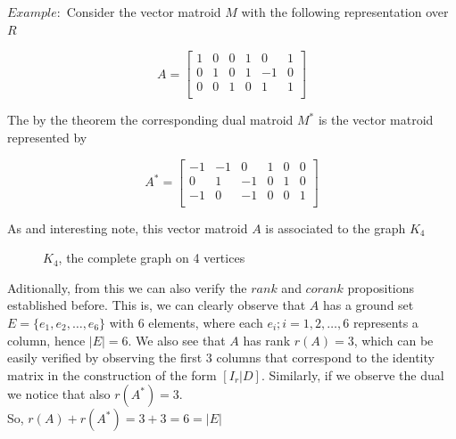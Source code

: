 $Example:$ Consider the vector matroid $M$ with the following representation over $R$
        \begin{figure}[H]
            $$A = \begin{bmatrix}
                1 & 0 & 0 & 1 & 0 & 1 \\
                0 & 1 & 0 & 1 & -1 & 0 \\
                0 & 0 & 1 & 0 & 1 & 1 \\
            \end{bmatrix}$$
        \end{figure}
        
The by the theorem the corresponding dual matroid $M^*$ is the vector matroid represented by 
        \begin{figure}[H]
            $$A^* = \begin{bmatrix}
                -1 & -1 & 0 & 1 & 0 & 0 \\
                0 & 1 & -1 & 0 & 1 & 0 \\
                -1 & 0 & -1 & 0 & 0 & 1 \\
            \end{bmatrix}$$
        \end{figure}
As and interesting note, this vector matroid $A$ is associated to the graph $K_4$ 
       \begin{figure}[H]
        \centering
            \caption{$K_4$, the complete graph on 4 vertices}
            \label{fig:enter-label}
        \end{figure}

Aditionally, from this we can also verify the $rank$ and $corank$ propositions established before. This is, we can clearly observe that $A$ has a ground set $E=\{e_1, e_2, \dots , e_6\}$ with 6 elements, where each $e_i; i =1,2, \dots,6$ represents a column, hence $|E|=6$. We also see that $A$ has rank $r(A)=3$, which can be easily verified by observing the first 3 columns that correspond to the identity matrix in the construction of the form $[I_r|D]$. Similarly, if we observe the dual we notice that also $r(A^*)=3$. \\So, $r(A)+r(A^*)= 3 + 3 = 6 = |E|$\\


